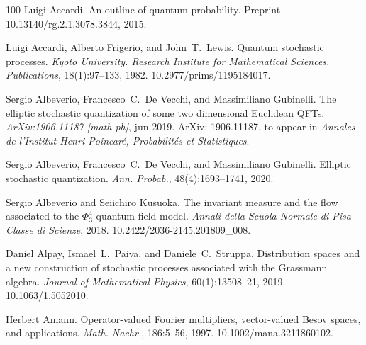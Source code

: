 \documentclass{article}
\newcommand{\tmtextit}[1]{{\itshape{#1}}}
\begin{document}
\begin{thebibliography}{100}
  Luigi Accardi. {\newblock}An outline of
  quantum probability. {\newblock}Preprint
  \href{https://doi.org/10.13140/rg.2.1.3078.3844}{}10.13140/rg.2.1.3078.3844,
  2015.{\newblock}
  
  Luigi Accardi, Alberto Frigerio, and 
  John~T.~Lewis. {\newblock}Quantum stochastic processes.
  {\newblock}\tmtextit{Kyoto University. Research Institute for Mathematical
  Sciences. Publications}, 18(1):97--133, 1982.
  {\newblock}\href{Https://doi.org/10.2977/prims/1195184017}{}10.2977/prims/1195184017.{\newblock}
  
  Sergio Albeverio, Francesco~C.~De
  Vecchi, and  Massimiliano Gubinelli. {\newblock}The elliptic stochastic
  quantization of some two dimensional Euclidean QFTs.
  {\newblock}\tmtextit{ArXiv:1906.11187 [math-ph]}, jun 2019.
  {\newblock}ArXiv: 1906.11187, to appear in {\textit{Annales de l'Institut
  Henri Poincar{\'e}, Probabilit{\'e}s et Statistiques}}.{\newblock}
  
  Sergio Albeverio, Francesco~C.~De
  Vecchi, and  Massimiliano Gubinelli. {\newblock}Elliptic stochastic
  quantization. {\newblock}\tmtextit{Ann. Probab.}, 48(4):1693--1741,
  2020.{\newblock}
  
  Sergio Albeverio  and  Seiichiro
  Kusuoka. {\newblock}The invariant measure and the flow associated to the
  $\Phi^4_3$-quantum field model. {\newblock}\tmtextit{Annali della Scuola
  Normale di Pisa - Classe di Scienze}, 2018.
  {\newblock}\href{Https://doi.org/10.2422/2036-2145.201809_008}{}10.2422/2036-2145.201809\_008.{\newblock}
  
  Daniel Alpay, Ismael~L.~Paiva, and 
  Daniele~C.~Struppa. {\newblock}Distribution spaces and a new construction of
  stochastic processes associated with the Grassmann algebra.
  {\newblock}\tmtextit{Journal of Mathematical Physics}, 60(1):13508--21,
  2019.
  {\newblock}\href{Https://doi.org/10.1063/1.5052010}{}10.1063/1.5052010.{\newblock}
  
  Herbert Amann. {\newblock}Operator-valued Fourier
  multipliers, vector-valued Besov spaces, and applications.
  {\newblock}\tmtextit{Math. Nachr.}, 186:5--56, 1997.
  {\newblock}\href{Https://doi.org/10.1002/mana.3211860102}{}10.1002/mana.3211860102.{\newblock}
  

\end{thebibliography}
\end{document}
